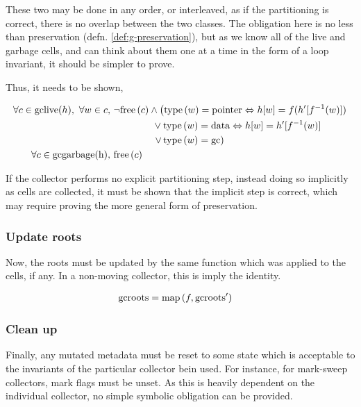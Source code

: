 These two may be done in any order, or interleaved, as if the
partitioning is correct, there is no overlap between the two
classes. The obligation here is no less than preservation
(defn. \ref{def:g-preservation}), but as we know all of the live and
garbage cells, and can think about them one at a time in the form of a
loop invariant, it should be simpler to prove.

Thus, it needs to be shown,

\begin{align*}
  \forall c \in \mathrm{gclive}(h),\ \forall w \in c,\ & \lnot\mathrm{free}\left(c\right) \land 
  \left(\mathrm{type}\left(w\right) = \mathrm{pointer} \Leftrightarrow h[w] =
    f(h'[f^{-1}(w)])\right.\\
  &\quad\quad\quad\quad \lor \mathrm{type}\left(w\right) = \mathrm{data}
  \Leftrightarrow h[w] = h'[f^{-1}(w)]\\
  &\quad\quad\quad\quad \left.\lor\thinspace\mathrm{type}\left(w\right) =
    \mathrm{gc}\right)\\
  \forall c \in \mathrm{gcgarbage(h)},\ & \mathrm{free}\left(c\right)
\end{align*}

If the collector performs no explicit partitioning step, instead doing
so implicitly as cells are collected, it must be shown that the
implicit step is correct, which may require proving the more general
form of preservation.

\subsubsection{Update roots}
\label{sec:gc-framework-obligations-roots}

Now, the roots must be updated by the same function which was applied
to the cells, if any. In a non-moving collector, this is imply the
identity.

\begin{align*}
  \mathrm{gcroots} &= \mathrm{map}\left(f, \mathrm{gcroots'}\right)
\end{align*}

\subsubsection{Clean up}
\label{sec:gc-framework-obligations-clean}

Finally, any mutated metadata must be reset to some state which is
acceptable to the invariants of the particular collector bein
used. For instance, for mark-sweep collectors, mark flags must be
unset. As this is heavily dependent on the individual collector, no
simple symbolic obligation can be provided.

